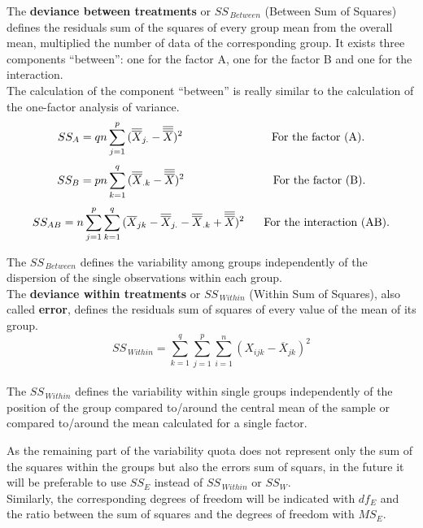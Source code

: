 \begin{frame}
  The \textbf{deviance between treatments} or {\boldmath$SS_{\,Between}$} (Between Sum of Squares) defines the residuals sum of the squares of every group mean from the overall mean, multiplied the number of data of the corresponding group.  It exists three components ``between'': one for the factor A, one for the factor B and one for the interaction.\\
  The calculation of the component ``between'' is really similar to the calculation of the one-factor analysis of variance.\\
  $$ SS_A = qn \sum_{j=1}^p{(\overline{\overline{X}}_{j.}-\overline{\overline{\overline{X}}})^2}\mbox{\hspace*{2.75cm}For the factor  (A).} $$
  $$ SS_B = pn \sum_{k=1}^q{(\overline{\overline{X}}_{.k}-\overline{\overline{\overline{X}}})^2}\mbox{\hspace*{2.75cm}For the factor (B).} $$
  $$ SS_{AB} = n \sum_{j=1}^p{\sum_{k=1}^q{(\overline{X}_{jk}-\overline{\overline{X}}_{j.}-\overline{\overline{X}}_{.k}+\overline{\overline{\overline{X}}})^2}}\mbox{\hspace*{.6cm}For the interaction (AB).} $$
\end{frame}

\begin{frame}
  \vspace*{.25cm} 
  The {\boldmath$SS_{\,Between}$} defines the variability among groups independently of the dispersion of the single observations within each group.\\
  \vspace*{.5cm} 
  The \textbf{deviance within treatments} or {\boldmath$SS_{\,Within}$} (Within Sum of Squares), also called \textbf{error}, defines the residuals sum of squares of every value of the mean of its group.\\
  $$ SS_{\,Within}=\sum_{k=1}^{q} \sum_{j=1}^{p} \sum_{i=1}^{n}{(X_{ijk}-\overline{X}_{jk})^2} $$\\
  \vspace*{.25cm}
  The {\boldmath$SS_{\,Within}$} defines the variability within single groups independently of the position of the group compared to/around the central mean of the sample or compared to/around the mean calculated for a single factor. 
\end{frame}

\begin{frame}
  \vspace*{.75cm} 
  As the remaining part of the variability quota does not represent only the sum of the squares within the groups but also the errors sum of squars, in the future it will be preferable to use {\boldmath$SS_{E}$} instead of {\boldmath$SS_{\,Within}$} or {\boldmath$SS_{W}$}.\\
  \vspace*{.5cm} 
  Similarly, the corresponding degrees of freedom will be indicated with $ df_{E} $ and the ratio between the sum of squares and the degrees of freedom with $ MS_{E} $.
\end{frame}

